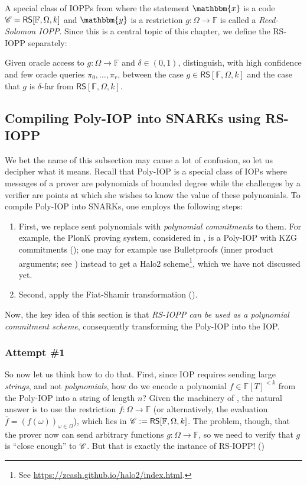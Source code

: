 \documentclass[../../book]{subfiles}
\begin{document}
A special class of IOPPs from  where the statement $\mathbbm{x}$ is a code $\mathscr{C} = \mathsf{RS}[\mathbb{F},\Omega,k]$ and $\mathbbm{y}$ is a restriction $g: \Omega \to \mathbb{F}$ is called a \emph{Reed-Solomon IOPP}.
Since this is a central topic of this chapter, we define the RS-IOPP separately:
\begin{definition}\label{def:rs-proximity}
  Given oracle access to $g: \Omega \to \mathbb{F}$ and $\delta \in (0,1)$, distinguish, with high confidence and few oracle queries $\pi_0,\dots,\pi_r$, between the case $g \in \mathsf{RS}[\mathbb{F}, \Omega, k]$ and the case that $g$ is $\delta$-far from $\mathsf{RS}[\mathbb{F}, \Omega, k]$.
\end{definition}

\subsection{Compiling Poly-IOP into SNARKs using RS-IOPP}

We bet the name of this subsection may cause a lot of confusion, so let us decipher what it means. 
Recall that Poly-IOP is a special class of IOPs where messages of a prover are polynomials of bounded degree while the challenges by a verifier are points at which she wishes to know the value of these polynomials.
To compile Poly-IOP into SNARKs, one employs the following steps:
\begin{enumerate}
  \item First, we replace sent polynomials with \emph{polynomial commitments} to them. 
  For example, the PlonK proving system, considered in , is a Poly-IOP with KZG commitments (); one may for example use Bulletproofs (inner product arguments; see ) instead to get a Halo2 scheme\footnote{See \url{https://zcash.github.io/halo2/index.html}.}, which we have not discussed yet.
  \item Second, apply the Fiat-Shamir transformation ().
\end{enumerate}

Now, the key idea of this section is that \emph{RS-IOPP can be used as a polynomial commitment scheme}, consequently transforming the Poly-IOP into the IOP. 

\subsubsection{Attempt \#1}
So now let us think how to do that. First, since IOP requires sending large \emph{strings}, and not \emph{polynomials}, how do we encode a polynomial $f \in \mathbb{F}[T]^{<k}$ from the Poly-IOP into a string of length $n$?
Given the machinery of , the natural answer is to use the restriction $\overline{f}: \Omega \to \mathbb{F}$ (or alternatively, the evaluation $\overline{f} = (f(\omega))_{\omega \in \Omega}$), which lies in $\mathscr{C} := \mathsf{RS}[\mathbb{F},\Omega,k]$.
The problem, though, that the prover now can send arbitrary functions $g: \Omega \to \mathbb{F}$, so we need to verify that $g$ is ``close enough'' to $\mathscr{C}$.
But that is exactly the instance of RS-IOPP! ()
\end{document}
